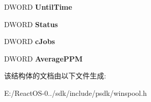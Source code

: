 \begin{DoxyCompactItemize}
D\+W\+O\+RD {\bfseries Until\+Time}
\item 
\mbox{\label{struct___p_r_i_n_t_e_r___i_n_f_o__2_w_af976887c57a8acfbb69fa4f2493e0150}} 
D\+W\+O\+RD {\bfseries Status}
\item 
\mbox{\label{struct___p_r_i_n_t_e_r___i_n_f_o__2_w_a4120fbd9b196234537572e1009fbb7a1}} 
D\+W\+O\+RD {\bfseries c\+Jobs}
\item 
\mbox{\label{struct___p_r_i_n_t_e_r___i_n_f_o__2_w_a109b951d892ff1c1851b4d982e750c15}} 
D\+W\+O\+RD {\bfseries Average\+P\+PM}
\end{DoxyCompactItemize}


该结构体的文档由以下文件生成\+:\begin{DoxyCompactItemize}
\item 
E\+:/\+React\+O\+S-\/0../sdk/include/psdk/winspool.\+h\end{DoxyCompactItemize}
